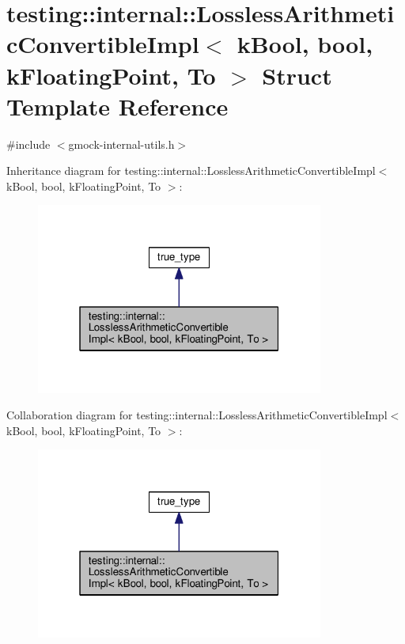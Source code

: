 \hypertarget{structtesting_1_1internal_1_1_lossless_arithmetic_convertible_impl_3_01k_bool_00_01bool_00_01k_floating_point_00_01_to_01_4}{}\section{testing\+:\+:internal\+:\+:Lossless\+Arithmetic\+Convertible\+Impl$<$ k\+Bool, bool, k\+Floating\+Point, To $>$ Struct Template Reference}
\label{structtesting_1_1internal_1_1_lossless_arithmetic_convertible_impl_3_01k_bool_00_01bool_00_01k_floating_point_00_01_to_01_4}


{\ttfamily \#include $<$gmock-\/internal-\/utils.\+h$>$}



Inheritance diagram for testing\+:\+:internal\+:\+:Lossless\+Arithmetic\+Convertible\+Impl$<$ k\+Bool, bool, k\+Floating\+Point, To $>$\+:
\nopagebreak
\begin{figure}[H]
\begin{center}
\leavevmode
\includegraphics[width=268pt]{structtesting_1_1internal_1_1_lossless_arithmetic_convertible_impl_3_01k_bool_00_01bool_00_01k_fe2644d499788ba99de559cd470f71f8f}
\end{center}
\end{figure}


Collaboration diagram for testing\+:\+:internal\+:\+:Lossless\+Arithmetic\+Convertible\+Impl$<$ k\+Bool, bool, k\+Floating\+Point, To $>$\+:
\nopagebreak
\begin{figure}[H]
\begin{center}
\leavevmode
\includegraphics[width=268pt]{structtesting_1_1internal_1_1_lossless_arithmetic_convertible_impl_3_01k_bool_00_01bool_00_01k_fbe85bd9146e6cffe5ea653cc631a74aa}
\end{center}
\end{figure}
